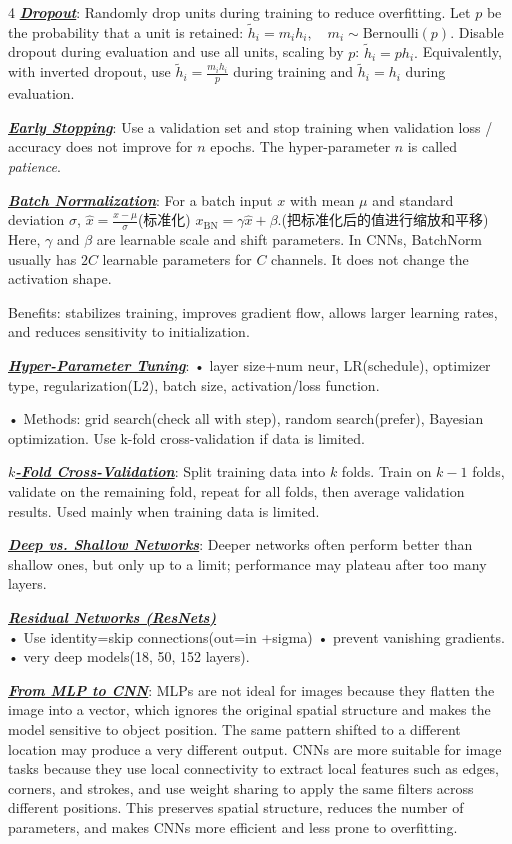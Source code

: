 \documentclass[12pt]{article}
\newcommand{\bulletPoint}[1]{\underline{\textit{\textbf{#1}}}}
\begin{document}
\begin{multicols*}{4}
\bulletPoint{Dropout}:
Randomly drop units during training to reduce overfitting.
Let $p$ be the probability that a unit is retained:
$
\tilde{h}_i = m_i h_i, \quad m_i \sim \mathrm{Bernoulli}(p).
$
Disable dropout during evaluation and use all units, scaling by $p$:
$
\tilde{h}_i = p h_i.
$
Equivalently, with inverted dropout, use $\tilde{h}_i = \frac{m_i h_i}{p}$ during training and $\tilde{h}_i = h_i$ during evaluation.

\bulletPoint{Early Stopping}:
Use a validation set and stop training when validation loss / accuracy does not improve for $n$ epochs.
The hyper-parameter $n$ is called \emph{patience}.

\bulletPoint{Batch Normalization}:
For a batch input $x$ with mean $\mu$ and standard deviation $\sigma$,
$
\hat{x}=\frac{x-\mu}{\sigma}$(标准化) $ x_{\mathrm{BN}}=\gamma \hat{x}+\beta .
$(把标准化后的值进行缩放和平移)
Here, $\gamma$ and $\beta$ are learnable scale and shift parameters. In CNNs, BatchNorm usually has $2C$ learnable parameters for $C$ channels. It does not change the activation shape.

Benefits: stabilizes training, improves gradient flow, allows larger learning rates, and reduces sensitivity to initialization.

\bulletPoint{Hyper-Parameter Tuning}:
• layer size+num neur, LR(schedule), optimizer type, regularization(L2), batch size, activation/loss function. \quad

• Methods: grid search(check all with step), random search(prefer), Bayesian optimization. Use k-fold cross-validation if data is limited.


\bulletPoint{$k$-Fold Cross-Validation}:
Split training data into $k$ folds.
Train on $k-1$ folds, validate on the remaining fold, repeat for all folds, then average validation results.
Used mainly when training data is limited.

\bulletPoint{Deep vs. Shallow Networks}:
Deeper networks often perform better than shallow ones, but only up to a limit; performance may plateau after too many layers.

\bulletPoint{Residual Networks (ResNets)} \\
• Use identity=skip connections(out=in +sigma)\quad
• prevent vanishing gradients. \quad
• very deep models(18, 50, 152 layers).

\bulletPoint{From MLP to CNN}:
MLPs are not ideal for images because they flatten the image into a vector, which ignores the original spatial structure and makes the model sensitive to object position. The same pattern shifted to a different location may produce a very different output. CNNs are more suitable for image tasks because they use local connectivity to extract local features such as edges, corners, and strokes, and use weight sharing to apply the same filters across different positions. This preserves spatial structure, reduces the number of parameters, and makes CNNs more efficient and less prone to overfitting.


\end{multicols*}
\end{document}
